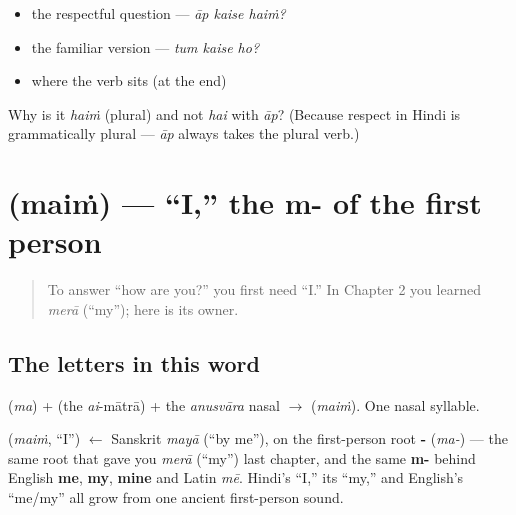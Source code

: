 \begin{itemize}
\raggedright
  \item the respectful question — \emph{āp kaise haiṁ?}
  \item the familiar version — \emph{tum kaise ho?}
  \item where the verb sits (at the end)
\end{itemize}

\begin{tcolorbox}[breakable,colback=teal!4,colframe=teal!35!black,title={Before you move on}]
Why is it \emph{haiṁ} (plural) and not \emph{hai} with \emph{āp}? (Because respect in Hindi is grammatically plural — \emph{āp} always takes the plural verb.)
\end{tcolorbox}
\section[\texorpdfstring{\hi{मैं} (maiṁ)}{मैं (maiṁ)}]{ (maiṁ) — \textquotedblleft{}I,\textquotedblright{} the m- of the first person}

\label{lesson:HI-C03-main}



\begin{quote}
To answer \textquotedblleft{}how are you?\textquotedblright{} you first need \textquotedblleft{}I.\textquotedblright{} In Chapter 2 you learned \emph{merā} (\textquotedblleft{}my\textquotedblright{}); here is its owner.
\end{quote}

\subsection*{The letters in this word}
\textbf{} (\emph{ma}) + \textbf{} (the \emph{ai}-mātrā) + the \emph{anusvāra} nasal \textbf{} $\to$ \textbf{} (\emph{maiṁ}). One nasal syllable.

\begin{cousinweb}
\textbf{} (\emph{maiṁ}, \textquotedblleft{}I\textquotedblright{}) $\leftarrow$ Sanskrit \emph{mayā} (\textquotedblleft{}by me\textquotedblright{}), on the first-person root \textbf{-} (\emph{ma-}) — the same root that gave you \emph{merā} (\textquotedblleft{}my\textquotedblright{}) last chapter, and the same \textbf{m-} behind English \textbf{me}, \textbf{my}, \textbf{mine} and Latin \emph{mē}. Hindi's \textquotedblleft{}I,\textquotedblright{} its \textquotedblleft{}my,\textquotedblright{} and English's \textquotedblleft{}me/my\textquotedblright{} all grow from one ancient first-person sound.
\end{cousinweb}

